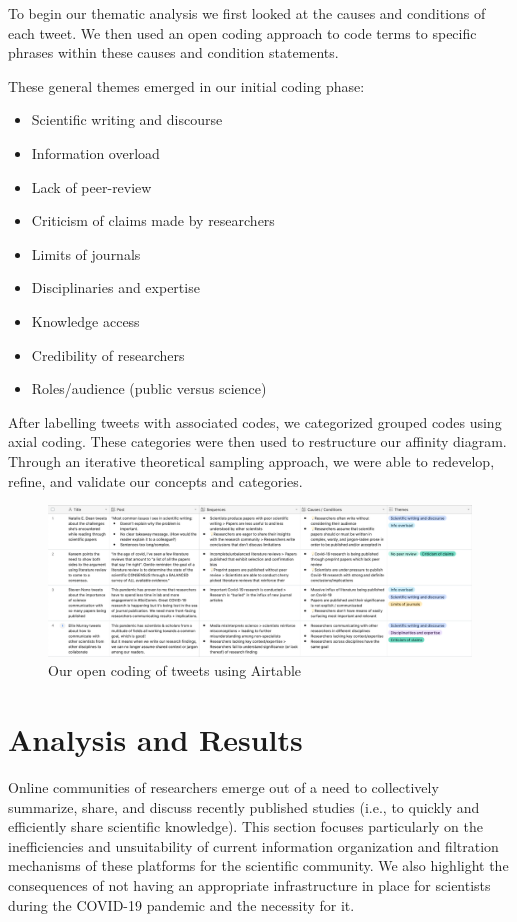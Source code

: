 \documentclass[acmsmall,authordraft]{acmart}
\begin{document}
To begin our thematic analysis we first looked at the causes and conditions of each tweet. We then used an open coding approach to code terms to specific phrases within these causes and condition statements.   

These general themes emerged in our initial coding phase:
\begin{itemize}
    \item Scientific writing and discourse
    \item Information overload
    \item Lack of peer-review
    \item Criticism of claims made by researchers
    \item Limits of journals
    \item Disciplinaries and expertise
    \item Knowledge access
    \item Credibility of researchers
    \item Roles/audience (public versus science)
\end{itemize}

After labelling tweets with associated codes, we categorized grouped codes using axial coding. These categories were then used to restructure our affinity diagram. Through an iterative theoretical sampling approach, we were able to redevelop, refine, and validate our concepts and categories.

\begin{figure}
  \includegraphics[width=1\textwidth]{Pictures/Airtable.png}
  \caption{Our open coding of tweets using Airtable}
  \label{airtable}
\end{figure}


\section{Analysis and Results}
\label{Analysis_and_Results}
Online communities of researchers emerge out of a need to collectively summarize, share, and discuss recently published studies (i.e., to quickly and efficiently share scientific knowledge). This section focuses particularly on the inefficiencies and unsuitability of current information organization and filtration mechanisms of these platforms for the scientific community. We also highlight the consequences of not having an appropriate infrastructure in place for scientists during the COVID-19 pandemic and the necessity for it.
\end{document}
